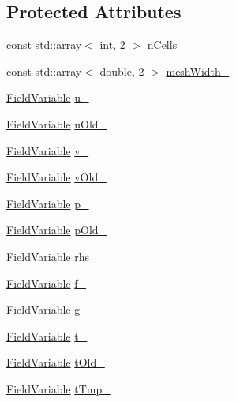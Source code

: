 \subsection*{Protected Attributes}
\begin{DoxyCompactItemize}
\item 
const std\+::array$<$ int, 2 $>$ \mbox{\hyperlink{classStaggeredGrid_acacffb5739539d9015c986080bb5ed44}{n\+Cells\+\_\+}}
\item 
const std\+::array$<$ double, 2 $>$ \mbox{\hyperlink{classStaggeredGrid_a9603c3334440aab082dda48947e5ce6e}{mesh\+Width\+\_\+}}
\item 
\mbox{\hyperlink{classFieldVariable}{Field\+Variable}} \mbox{\hyperlink{classStaggeredGrid_adcef36b4ce8cc6843a2b6f603b62c763}{u\+\_\+}}
\item 
\mbox{\hyperlink{classFieldVariable}{Field\+Variable}} \mbox{\hyperlink{classStaggeredGrid_aa3bb4cbb809f61c4ed406d41c1dcda10}{u\+Old\+\_\+}}
\item 
\mbox{\hyperlink{classFieldVariable}{Field\+Variable}} \mbox{\hyperlink{classStaggeredGrid_a20ec43568fe937b194561e21a0b84ad9}{v\+\_\+}}
\item 
\mbox{\hyperlink{classFieldVariable}{Field\+Variable}} \mbox{\hyperlink{classStaggeredGrid_ac7e8b1b8a9b054eda5e7c2630d71374a}{v\+Old\+\_\+}}
\item 
\mbox{\hyperlink{classFieldVariable}{Field\+Variable}} \mbox{\hyperlink{classStaggeredGrid_a2ea3c93dd401ac06461ade9a74e76459}{p\+\_\+}}
\item 
\mbox{\hyperlink{classFieldVariable}{Field\+Variable}} \mbox{\hyperlink{classStaggeredGrid_a508941dcce592296c421b594adecaa00}{p\+Old\+\_\+}}
\item 
\mbox{\hyperlink{classFieldVariable}{Field\+Variable}} \mbox{\hyperlink{classStaggeredGrid_a496206955162452a0629a7742fe92a84}{rhs\+\_\+}}
\item 
\mbox{\hyperlink{classFieldVariable}{Field\+Variable}} \mbox{\hyperlink{classStaggeredGrid_a94933ac0c6e0d2a794f46c7a97d72f75}{f\+\_\+}}
\item 
\mbox{\hyperlink{classFieldVariable}{Field\+Variable}} \mbox{\hyperlink{classStaggeredGrid_a5f5c88f603d4e503cba4c44ed43de46a}{g\+\_\+}}
\item 
\mbox{\hyperlink{classFieldVariable}{Field\+Variable}} \mbox{\hyperlink{classStaggeredGrid_a06b3931e80b76e4041fb9218acbbb1c5}{t\+\_\+}}
\item 
\mbox{\hyperlink{classFieldVariable}{Field\+Variable}} \mbox{\hyperlink{classStaggeredGrid_ad80da5cc1270c723c9545b8a35e0d6b6}{t\+Old\+\_\+}}
\item 
\mbox{\hyperlink{classFieldVariable}{Field\+Variable}} \mbox{\hyperlink{classStaggeredGrid_aa3854beee95d66eee193a4b841b7c720}{t\+Tmp\+\_\+}}
\end{DoxyCompactItemize}


